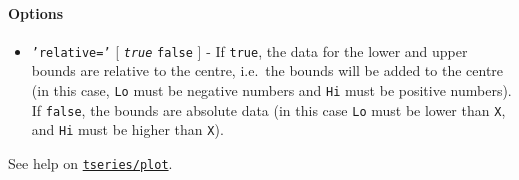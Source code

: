 \paragraph{Options}\label{options}

\begin{itemize}
\itemsep1pt\parskip0pt
\item
  \texttt{'relative='} {[} \emph{\texttt{true}} \textbar{}
  \texttt{false} {]} - If \texttt{true}, the data for the lower and
  upper bounds are relative to the centre, i.e.~the bounds will be added
  to the centre (in this case, \texttt{Lo} must be negative numbers and
  \texttt{Hi} must be positive numbers). If \texttt{false}, the bounds
  are absolute data (in this case \texttt{Lo} must be lower than
  \texttt{X}, and \texttt{Hi} must be higher than \texttt{X}).
\end{itemize}

See help on \href{tseries/plot}{\texttt{tseries/plot}}.


